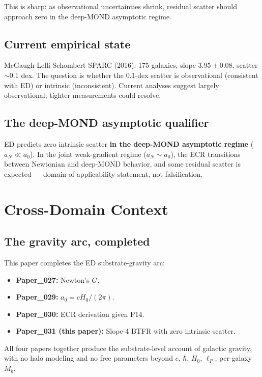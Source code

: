 \documentclass[11pt,a4paper]{article}
\begin{document}
This is sharp: as observational uncertainties shrink, residual scatter should approach zero in the deep-MOND asymptotic regime.

\subsection{Current empirical state}

McGaugh-Lelli-Schombert SPARC (2016): 175 galaxies, slope $3.95 \pm 0.08$, scatter $\sim$0.1 dex. The question is whether the 0.1-dex scatter is observational (consistent with ED) or intrinsic (inconsistent). Current analyses suggest largely observational; tighter measurements could resolve.

\subsection{The deep-MOND asymptotic qualifier}

ED predicts zero intrinsic scatter \textbf{in the deep-MOND asymptotic regime} ($a_N \ll a_0$). In the joint weak-gradient regime ($a_N \sim a_0$), the ECR transitions between Newtonian and deep-MOND behavior, and some residual scatter is expected --- domain-of-applicability statement, not falsification.

\section{Cross-Domain Context}

\subsection{The gravity arc, completed}

This paper completes the ED substrate-gravity arc:

\begin{itemize}[noitemsep]
\item \textbf{Paper\_027:} Newton's $G$.
\item \textbf{Paper\_029:} $a_0 = cH_0/(2\pi)$.
\item \textbf{Paper\_030:} ECR derivation given P14.
\item \textbf{Paper\_031 (this paper):} Slope-4 BTFR with zero intrinsic scatter.
\end{itemize}

All four papers together produce the substrate-level account of galactic gravity, with no halo modeling and no free parameters beyond $c$, $\hbar$, $H_0$, $\ell_P$, per-galaxy $M_b$.
\end{document}
